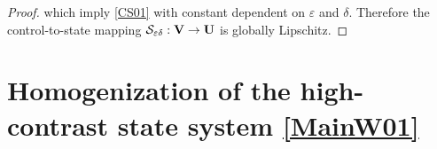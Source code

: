 \documentclass[11pt,a4paper]{article}
\numberwithin{equation}{section}
\def\O{\Omega}
\def\d{\delta}
\def\e{\varepsilon}
\def\Ga{{\bf a}}
\def\Sc{{\mathcal{S}}}
\def\ed{{\varepsilon\delta}}
\def\Ga{{\bf a}}
\def\GU{{\bf U}}
\def\GV{{\bf V}}
\begin{document}
\begin{proof}
	which imply \eqref{CS01} with constant dependent on $\e$ and $\d$.
%	
	Therefore the control-to-state mapping $\Sc_\ed:\GV\to\GU$ is globally Lipschitz.
\end{proof}

\section{Homogenization of the high-contrast state system \eqref{MainW01}}\label{prototype}
\end{document}
